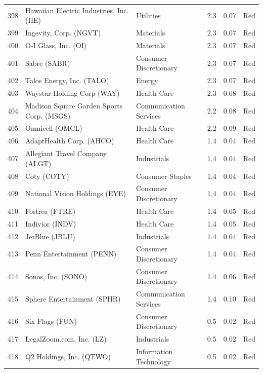 \documentclass[11pt,a4paper]{article}
\begin{document}
{\begin{longtable}{r p{4.6cm} p{3cm} r r l}
398 & Hawaiian Electric Industries, Inc. (HE) & Utilities & 2.3 & 0.07 & \cellcolor[HTML]{F4B6B6}Red \\
399 & Ingevity, Corp. (NGVT) & Materials & 2.3 & 0.07 & \cellcolor[HTML]{F4B6B6}Red \\
400 & O-I Glass, Inc. (OI) & Materials & 2.3 & 0.07 & \cellcolor[HTML]{F4B6B6}Red \\
401 & Sabre (SABR) & Consumer Discretionary & 2.3 & 0.07 & \cellcolor[HTML]{F4B6B6}Red \\
402 & Talos Energy, Inc. (TALO) & Energy & 2.3 & 0.07 & \cellcolor[HTML]{F4B6B6}Red \\
403 & Waystar Holding Corp (WAY) & Health Care & 2.3 & 0.08 & \cellcolor[HTML]{F4B6B6}Red \\
404 & Madison Square Garden Sports Corp. (MSGS) & Communication Services & 2.2 & 0.08 & \cellcolor[HTML]{F4B6B6}Red \\
405 & Omnicell (OMCL) & Health Care & 2.2 & 0.09 & \cellcolor[HTML]{F4B6B6}Red \\
406 & AdaptHealth Corp. (AHCO) & Health Care & 1.4 & 0.04 & \cellcolor[HTML]{F4B6B6}Red \\
407 & Allegiant Travel Company (ALGT) & Industrials & 1.4 & 0.04 & \cellcolor[HTML]{F4B6B6}Red \\
408 & Coty (COTY) & Consumer Staples & 1.4 & 0.04 & \cellcolor[HTML]{F4B6B6}Red \\
409 & National Vision Holdings (EYE) & Consumer Discretionary & 1.4 & 0.04 & \cellcolor[HTML]{F4B6B6}Red \\
410 & Fortrea (FTRE) & Health Care & 1.4 & 0.05 & \cellcolor[HTML]{F4B6B6}Red \\
411 & Indivior (INDV) & Health Care & 1.4 & 0.05 & \cellcolor[HTML]{F4B6B6}Red \\
412 & JetBlue (JBLU) & Industrials & 1.4 & 0.04 & \cellcolor[HTML]{F4B6B6}Red \\
413 & Penn Entertainment (PENN) & Consumer Discretionary & 1.4 & 0.04 & \cellcolor[HTML]{F4B6B6}Red \\
414 & Sonos, Inc. (SONO) & Consumer Discretionary & 1.4 & 0.06 & \cellcolor[HTML]{F4B6B6}Red \\
415 & Sphere Entertainment (SPHR) & Communication Services & 1.4 & 0.10 & \cellcolor[HTML]{F4B6B6}Red \\
416 & Six Flags (FUN) & Consumer Discretionary & 0.5 & 0.02 & \cellcolor[HTML]{F4B6B6}Red \\
417 & LegalZoom.com, Inc. (LZ) & Industrials & 0.5 & 0.02 & \cellcolor[HTML]{F4B6B6}Red \\
418 & Q2 Holdings, Inc. (QTWO) & Information Technology & 0.5 & 0.02 & \cellcolor[HTML]{F4B6B6}Red \\
\hline
\end{longtable}}
\end{document}
